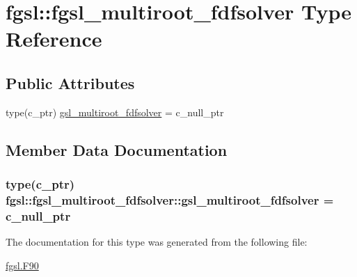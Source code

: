 \hypertarget{structfgsl_1_1fgsl__multiroot__fdfsolver}{}\section{fgsl\+:\+:fgsl\+\_\+multiroot\+\_\+fdfsolver Type Reference}
\label{structfgsl_1_1fgsl__multiroot__fdfsolver}
\subsection*{Public Attributes}
\begin{DoxyCompactItemize}
\item 
type(c\+\_\+ptr) \hyperlink{structfgsl_1_1fgsl__multiroot__fdfsolver_a071c869b109e79b914893dc43705ee66}{gsl\+\_\+multiroot\+\_\+fdfsolver} = c\+\_\+null\+\_\+ptr
\end{DoxyCompactItemize}


\subsection{Member Data Documentation}
\hypertarget{structfgsl_1_1fgsl__multiroot__fdfsolver_a071c869b109e79b914893dc43705ee66}{}
\subsubsection[{gsl\+\_\+multiroot\+\_\+fdfsolver}]{\setlength{\rightskip}{0pt plus 5cm}type(c\+\_\+ptr) fgsl\+::fgsl\+\_\+multiroot\+\_\+fdfsolver\+::gsl\+\_\+multiroot\+\_\+fdfsolver = c\+\_\+null\+\_\+ptr}\label{structfgsl_1_1fgsl__multiroot__fdfsolver_a071c869b109e79b914893dc43705ee66}


The documentation for this type was generated from the following file\+:\begin{DoxyCompactItemize}
\item 
\hyperlink{fgsl_8F90}{fgsl.\+F90}\end{DoxyCompactItemize}
